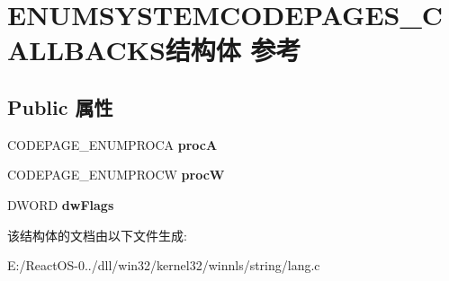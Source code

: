 \hypertarget{struct_e_n_u_m_s_y_s_t_e_m_c_o_d_e_p_a_g_e_s___c_a_l_l_b_a_c_k_s}{}\section{E\+N\+U\+M\+S\+Y\+S\+T\+E\+M\+C\+O\+D\+E\+P\+A\+G\+E\+S\+\_\+\+C\+A\+L\+L\+B\+A\+C\+K\+S结构体 参考}
\label{struct_e_n_u_m_s_y_s_t_e_m_c_o_d_e_p_a_g_e_s___c_a_l_l_b_a_c_k_s}
\subsection*{Public 属性}
\begin{DoxyCompactItemize}
\item 
\mbox{\label{struct_e_n_u_m_s_y_s_t_e_m_c_o_d_e_p_a_g_e_s___c_a_l_l_b_a_c_k_s_ac00f200f307e59011ffa6b127d7c3ea6}} 
C\+O\+D\+E\+P\+A\+G\+E\+\_\+\+E\+N\+U\+M\+P\+R\+O\+CA {\bfseries procA}
\item 
\mbox{\label{struct_e_n_u_m_s_y_s_t_e_m_c_o_d_e_p_a_g_e_s___c_a_l_l_b_a_c_k_s_afef01ce4c9ed13ca498d6dcb9ac499af}} 
C\+O\+D\+E\+P\+A\+G\+E\+\_\+\+E\+N\+U\+M\+P\+R\+O\+CW {\bfseries procW}
\item 
\mbox{\label{struct_e_n_u_m_s_y_s_t_e_m_c_o_d_e_p_a_g_e_s___c_a_l_l_b_a_c_k_s_a4395cc26a394edfefcf5ca335c012020}} 
D\+W\+O\+RD {\bfseries dw\+Flags}
\end{DoxyCompactItemize}


该结构体的文档由以下文件生成\+:\begin{DoxyCompactItemize}
\item 
E\+:/\+React\+O\+S-\/0../dll/win32/kernel32/winnls/string/lang.\+c\end{DoxyCompactItemize}
